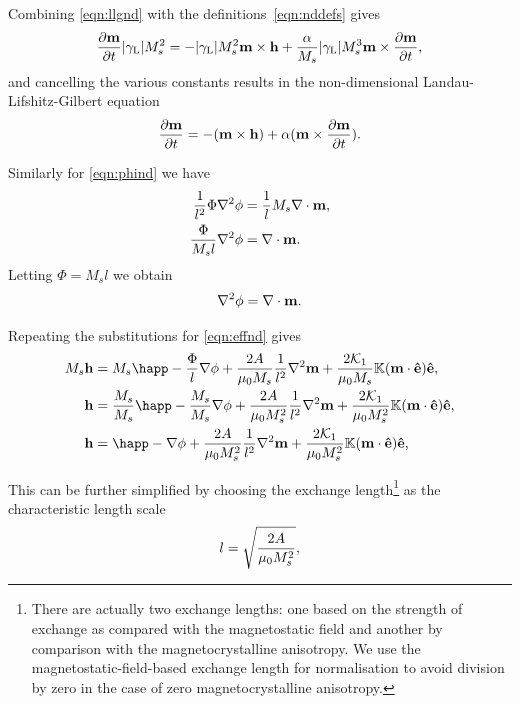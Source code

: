 Combining \cref{eqn:llgnd} with the definitions~\cref{eqn:nddefs} gives
\begin{equation}
   \frac{\partial \boldsymbol{\mathrm{m}}}{\partial t} {\left|{\gamma_{\mathrm{\tiny{L}}}} \right|} M_s^2 =
  - {\left|{\gamma_{\mathrm{\tiny{L}}}} \right|} M_s^2 \boldsymbol{\mathrm{m}} \times \boldsymbol{\mathrm{h}} + \frac{\alpha}{M_s} {\left|{\gamma_{\mathrm{\tiny{L}}}} \right|} M_s^3 \boldsymbol{\mathrm{m}} \times \frac{\partial \boldsymbol{\mathrm{m}}}{\partial t},
\end{equation}
and cancelling the various constants results in the non-dimensional Landau-Lifshitz-Gilbert equation
\begin{equation}
  \label{eq:53}
  \frac{\partial \boldsymbol{\mathrm{m}}}{\partial t} = - (\boldsymbol{\mathrm{m}} \times \boldsymbol{\mathrm{h}}) + \alpha (\boldsymbol{\mathrm{m}} \times \frac{\partial \boldsymbol{\mathrm{m}}}{\partial t}).
\end{equation}

Similarly for \cref{eqn:phind} we have
\begin{align*}
  \frac{1}{l^2} \Phi \nabla^2 \phi &= \frac{1}{l} M_s \nabla \cdot \boldsymbol{\mathrm{m}}, \\
  \frac{\Phi}{M_s l} \nabla^2 \phi &= \nabla \cdot \boldsymbol{\mathrm{m}}.
\end{align*}
Letting $\Phi = M_s l$ we obtain
\begin{equation}
  \label{eq:57}
  \nabla^2 \phi = \nabla \cdot \boldsymbol{\mathrm{m}}.
\end{equation}

Repeating the substitutions for \cref{eqn:effnd} gives
\begin{align*}
  M_s \hv &= M_s \happ - \frac{\Phi}{l} \grad \phi + \frac{2 \Exchc }{\mu_0 M_s} \frac{1}{l^2} \lap \mv + \frac{2\kone}{\mu_0 M_s}  \nK (\mv \cdot \ev) \ev, \\
  \hv &= \frac{M_s}{M_s} \happ - \frac{M_s}{M_s} \grad \phi + \frac{2 \Exchc}{\mu_0 M_s^2} \frac{1}{l^2} \lap \mv + \frac{2\kone}{\mu_0 M_s^2} \nK (\mv \cdot \ev) \ev, \\
  \hv &= \happ - \grad \phi + \frac{2 \Exchc}{\mu_0 M_s^2} \frac{1}{l^2} \lap \mv + \frac{2\kone}{\mu_0 M_s^2} \nK (\mv \cdot \ev) \ev, \\
\end{align*}

This can be further simplified by choosing the exchange length\footnote{There are actually two exchange lengths: one based on the strength of exchange as compared with the magnetostatic field and another by comparison with the magnetocrystalline anisotropy. We use the magnetostatic-field-based exchange length for normalisation to avoid division by zero in the case of zero magnetocrystalline anisotropy.} as the characteristic length scale
\begin{equation}
  \label{eqn:l-normalisation}
  l = \sqrt{ \frac{2 A}{\mu_0 M_s^2} },
\end{equation}

